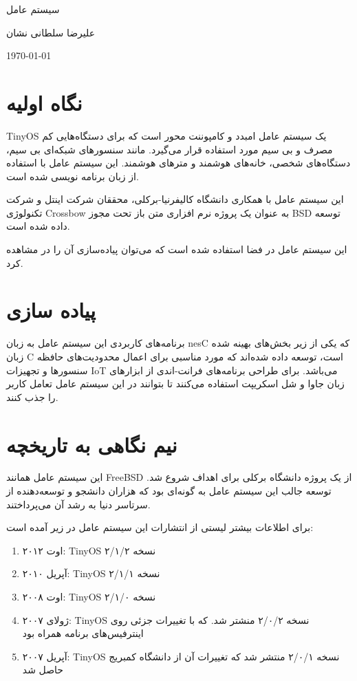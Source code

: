 \documentclass[20pt, a4paper]{article}
\begin{document}
\centerline{سیستم عامل }
\centerline{علیرضا سلطانی نشان}
\centerline{\today}
\tableofcontents

\section{نگاه اولیه}

TinyOS یک سیستم عامل امبدد و کامپوننت محور است که برای دستگاه‌هایی کم مصرف و بی
سیم مورد استفاده قرار می‌گیرد. مانند سنسور‌های شبکه‌ای بی سیم، دستگاه‌های شخصی،
خانه‌های هوشمند و متر‌های هوشمند. این سیستم عامل با استفاده از زبان 
برنامه نویسی شده است.

این سیستم عامل با همکاری دانشگاه کالیفرنیا-برکلی، محققان شرکت اینتل و شرکت
تکنولوژی Crossbow به عنوان یک پروژه نرم افزاری متن باز تحت مجوز BSD توسعه داده
شده است.

این سیستم عامل در فضا استفاده شده است که می‌توان پیاده‌سازی آن را در
 مشاهده کرد.

\section{پیاده سازی}

برنامه‌های کاربردی این سیستم عامل به زبان nesC که یکی از زیر بخش‌های بهینه شده
زبان C است، توسعه داده شده‌اند که مورد مناسبی برای اعمال محدودیت‌های حافظه
سنسور‌ها و تجهیزات IoT می‌باشد. برای طراحی برنامه‌های فرانت-اندی از ابزار‌های
زبان جاوا و شل اسکریپت استفاده می‌کنند تا بتوانند در این سیستم عامل تعامل کاربر
را جذب کنند.


\section{نیم نگاهی به تاریخچه}

این سیستم عامل همانند FreeBSD از یک پروژه دانشگاه برکلی برای اهداف  شروع شد. توسعه جالب این سیستم عامل به گونه‌ای بود که هزاران دانشجو و
توسعه‌دهنده از سرتاسر دنیا به رشد آن می‌پرداختند.

برای اطلاعات بیشتر لیستی از انتشارات این سیستم عامل در زیر آمده است:

\begin{enumerate}
    \item اوت ۲۰۱۲: TinyOS نسخه ۲/۱/۲
    \item آپریل ۲۰۱۰: TinyOS نسخه ۲/۱/۱
    \item اوت ۲۰۰۸: TinyOS نسخه ۲/۱/۰
    \item ژولای ۲۰۰۷: TinyOS نسخه ۲/۰/۲ منشتر شد. که با تغییرات جزئی روی
    اینترفیس‌های برنامه همراه بود
    \item آپریل ۲۰۰۷: TinyOS نسخه ۲/۰/۱  منتشر شد که تغییرات آن از دانشگاه
    کمبریج حاصل شد
\end{enumerate}
\end{document}
